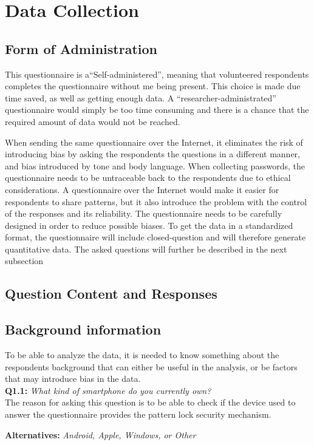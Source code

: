 \section{Data Collection} \label{sec:datacollection}


  \subsection{Form of Administration} \label{sec:formodadministration}

  This questionnaire is a``Self-administered'', meaning that volunteered respondents completes the questionnaire without me being present. This choice is made due time saved, as well as getting enough data. A ``researcher-administrated'' questionnaire would simply be too time consuming and there is a chance that the required amount of data would not be reached. 
    
  When sending the same questionnaire over the Internet, it eliminates the risk of introducing bias by asking the respondents the questions in a different manner, and bias introduced by tone and body language. When collecting passwords, the questionnaire needs to be untraceable back to the respondents due to ethical considerations. A questionnaire over the Internet would make it easier for respondents to share patterns, but it also introduce the problem with the control of the responses and its reliability. The questionnaire needs to be carefully designed in order to reduce possible biases. To get the data in a standardized format, the questionnaire will include closed-question and will therefore generate quantitative data. The asked questions will further be described in the next subsection

  \subsection{Question Content and Responses}\label{sec:questions}

    \subsection*{Background information} To be able to analyze the data, it is needed to know something about the respondents background that can either be useful in the analysis, or be factors that may introduce bias in the data.  \\

      {\bf Q1.1:} {\it What kind of smartphone do you currently own?} \\
      The reason for asking this question is to be able to check if the device used to answer the questionnaire provides the pattern lock security mechanism. 
        \begin{enumerate*}
          \item[ ] {\bf Alternatives:} {\it Android, Apple, Windows, or Other}
        \end{enumerate*}

